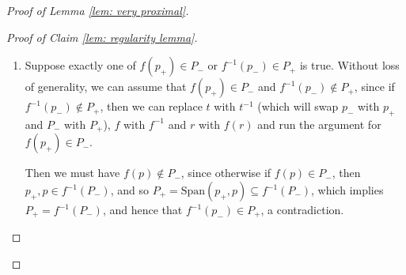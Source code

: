 \documentclass[12pt]{article}
\newcommand{\vs}{\vskip10pt}
\theoremstyle{definition}
\newcommand{\Span}{\mathrm{Span}}
\begin{document}
\begin{proof} [Proof of Lemma \ref{lem: very proximal}]
\begin{proof}[Proof of Claim \ref{lem: regularity lemma}]
\begin{enumerate}
        Suppose that for some $m > 0$, $(t^n f)^m$ is singular over $r$. If $(t^n f)^{m+1}$ is biregular over $r$, then since $t^{-n}$ is biregular over $(t^n f)^{m+1}(r)$, we have by \cite[Remark 4.4]{Algebraic} that $f(t^nf)^m = t^{-n} (t^n f)^{m+1}$ is biregular over $r$. Since $(t^nf)^m(r) \notin B$, we have that $f$ is biregular over $(t^nf)^m(r)$, and so by \cite[Remark 4.4]{Algebraic}, $f^{-1}$ is biregular over $f(t^nf)^m(r)$. Then again by \cite[Remark 4.4]{Algebraic}, we have that $(t^nf)^m = f^{-1}(f (t^nf)^m)$ is biregular over $r$, a contradiction. Therefore, $(t^nf)^m$ is singular over $r$ for all $m > 0$. 
\vs
        \underline{$(t^n f)^m$ is biregular over $r$ for all $m < 0$}:
\vs
        For $m = -1$, we have $t^{-n}(r) \notin B$, so $f^{-1}$ is biregular over $t^{-n}(r)$. By \cite[Remark 4.4]{Algebraic}, since $t^{-n}$ is biregular over $r$, we then have that $(t^nf)^{-1} = f^{-1}t^{-n}$ is biregular over $r$. 

        Suppose that $(t^nf)^m$ is biregular over $r$ for some $m < 0$. Since $t^{-n} (t^nf)^{m}(r) \notin B$, we have that $f^{-1}$ is biregular over $t^{-n} (t^nf)^{m-1}(r)$. Since $(t^nf)^m$ is biregular over $r$ and $t^{-n}$ is biregular over $(t^nf)^m(r)$, by \cite[Remark 4.4]{Algebraic}, we have that $t^{-n} (t^nf)^{m}$ is biregular over $r$. Lastly, since $t^{-n} (t^nf)^{m}$ is biregular over $r$ and $f^{-1}$ is biregular over $t^{-n} (t^nf)^{m}(r)$, one more application of \cite[Remark 4.4]{Algebraic} yields that $(t^n f)^{m-1} = f^{-1}t^{-n} (t^nf)^{m}(r)$ is biregular over $r$. Therefore, $(t^n f)^m$ is biregular over $r$ for each $m < 0$. 

        Thus, $t^nf$ has persistent fibre over $r$ (with $l = 1$), contradicting that $\Gamma$ acts purely elliptically. 

        Hence, we must have that $f$ is biregular over $r$. 

        \item Suppose exactly one of $f(p_+) \in P_-$ or $f^{-1}(p_-) \in P_+$ is true. Without loss of generality, we can assume that $f(p_+) \in P_-$ and $f^{-1}(p_-) \notin P_+$, since if $f^{-1}(p_-) \notin P_+$, then we can replace $t$ with $t^{-1}$ (which will swap $p_-$ with $p_+$ and $P_-$ with $P_+$), $f$ with $f^{-1}$ and $r$ with $f(r)$ and run the argument for $f(p_+) \in P_-$. %
        
        
        Then we must have $f(p) \notin P_-$, since otherwise if $f(p) \in P_-$, then $p_+, p \in f^{-1}(P_-)$, and so $P_+ = \Span(p_+, p) \subseteq f^{-1}(P_-)$, which implies $P_+ = f^{-1}(P_-)$, and hence that $f^{-1}(p_-) \in P_+$, a contradiction. 


\end{enumerate}
\end{proof}
\end{proof}
\end{document}

